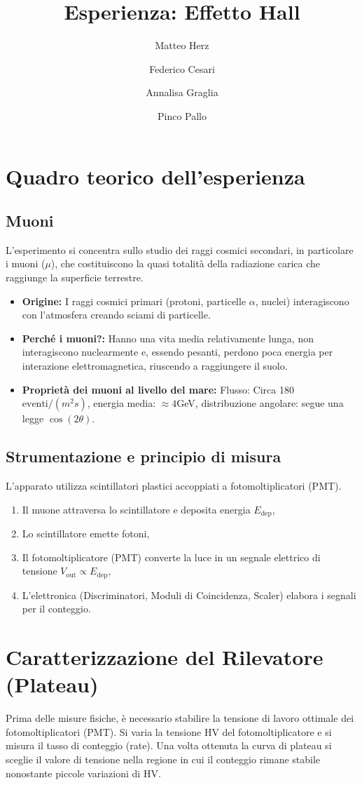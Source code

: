 \documentclass[a4paper,num-refs,strutturaTemplate]{style}
\title{Esperienza: Effetto Hall}
\author[1]{Matteo Herz}
\author[1]{Federico Cesari}
\author[1]{Annalisa Graglia}
\author[1]{Pinco Pallo}
\affil[1]{Gruppo D9}
\begin{document}
\begin{frontmatter}
\maketitle
\thispagestyle{empty}

\end{frontmatter}
\newpage



\section*{Quadro teorico dell'esperienza}
%
\subsection{Muoni}
L'esperimento si concentra sullo studio dei raggi cosmici secondari, in particolare i muoni (\(\mu\)), che costituiscono la quasi totalità della radiazione carica che raggiunge la superficie terrestre.
\begin{itemize}
      \item \textbf{Origine:} I raggi cosmici primari (protoni, particelle $\alpha$, nuclei) interagiscono con l'atmosfera creando sciami di particelle.
      \item \textbf{Perché i muoni?:} Hanno una vita media relativamente lunga, non interagiscono nuclearmente e, essendo pesanti, perdono poca energia per interazione elettromagnetica, riuscendo a raggiungere il suolo.
      \item \textbf{Proprietà dei muoni al livello del mare:} Flusso: Circa 180 $\text{eventi}/(m^2s)$, energia media: $\approx 4$GeV, distribuzione angolare: segue una legge \(\cos(2\theta)\).
\end{itemize}
%
\subsection{Strumentazione e principio di misura}
L'apparato utilizza scintillatori plastici accoppiati a fotomoltiplicatori (PMT).
\begin{enumerate}
      \item Il muone attraversa lo scintillatore e deposita energia $E_{\text{dep}}$,
      \item Lo scintillatore emette fotoni,
      \item Il fotomoltiplicatore (PMT) converte la luce in un segnale elettrico di tensione $V_{\text{out}} \propto  E_{\text{dep}}$,
      \item L'elettronica (Discriminatori, Moduli di Coincidenza, Scaler) elabora i segnali per il conteggio.
\end{enumerate}
%
%
%
\section{Caratterizzazione del Rilevatore (Plateau)}
Prima delle misure fisiche, è necessario stabilire la tensione di lavoro ottimale dei fotomoltiplicatori (PMT). Si varia la tensione HV del fotomoltiplicatore e si misura il tasso di conteggio (rate). Una volta ottenuta la curva di plateau si sceglie il valore di tensione nella regione in cui il conteggio rimane stabile nonostante piccole variazioni di HV.
%
%
%
\end{document}
